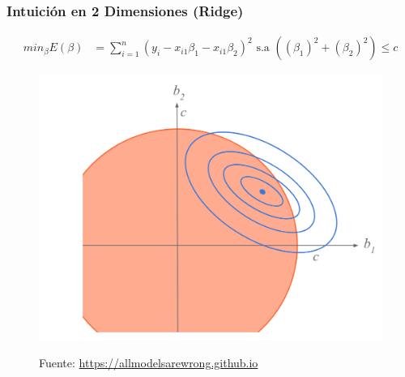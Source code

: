 \documentclass[
  shownotes,
  xcolor={svgnames},
  hyperref={colorlinks,citecolor=DarkBlue,linkcolor=DarkRed,urlcolor=DarkBlue}
  , aspectratio=169]{beamer}
\begin{document}
\begin{frame}[fragile]
\frametitle{Intuición en 2 Dimensiones (Ridge)}

\begin{align}
     min_{\beta} E(\beta) &= \sum_{i=1}^n (y_i - x_{i1}\beta_1 - x_{i1}\beta_2)^2  \text{ s.a }   \left( (\beta_1)^2 + (\beta_2)^2 \right) \leq c 
  \end{align}

\begin{figure}[H] \centering
            \captionsetup{justification=centering}
              \includegraphics[scale=0.3]{figures/ridge2}
 
\tiny
Fuente: \url{https://allmodelsarewrong.github.io}
\end{figure}


\end{frame}
\end{document}
